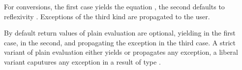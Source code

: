\begin{isabellebody}
\begin{isamarkuptext}
\begin{itemize}
  \end{itemize}

  \noindent For conversions, the first case yields the equation , the second defaults to reflexivity .
  Exceptions of the third kind are propagated to the user.

  By default return values of plain evaluation are optional, yielding
   in the first case,  in the
  second, and propagating the exception in the third case.  A strict
  variant of plain evaluation either yields  or propagates
  any exception, a liberal variant caputures any exception in a result
  of type .
  

\end{isamarkuptext}
\end{isabellebody}
